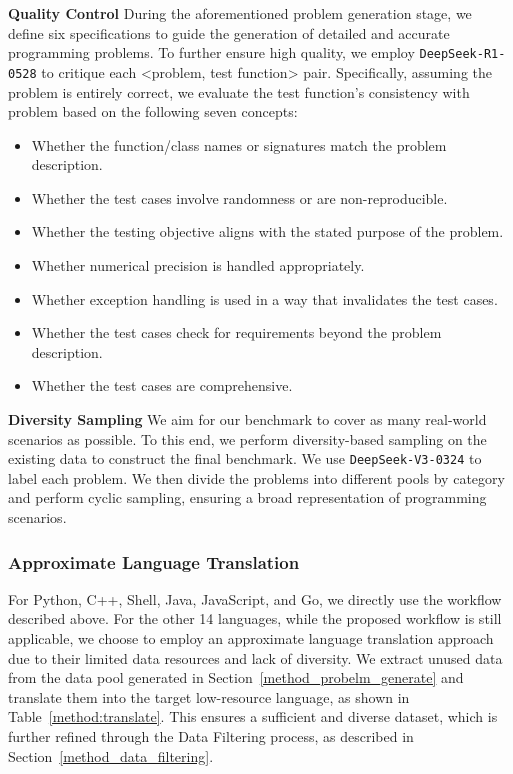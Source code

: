 \textbf{Quality Control} During the aforementioned problem generation stage, we define six specifications to guide the generation of detailed and accurate programming problems. To further ensure high quality, we employ \texttt{DeepSeek-R1-0528} to critique each \textless{}problem, test function\textgreater{} pair. Specifically, assuming the problem is entirely correct, we evaluate the test function’s consistency with problem based on the following seven concepts:
\begin{itemize}
    \item Whether the function/class names or signatures match the problem description.
    \item Whether the test cases involve randomness or are non-reproducible.
    \item Whether the testing objective aligns with the stated purpose of the problem.
    \item Whether numerical precision is handled appropriately.
    \item Whether exception handling is used in a way that invalidates the test cases.
    \item Whether the test cases check for requirements beyond the problem description.
    \item Whether the test cases are comprehensive.
\end{itemize}


\textbf{Diversity Sampling}
We aim for our benchmark to cover as many real-world scenarios as possible. To this end, we perform diversity-based sampling on the existing data to construct the final benchmark. We use \texttt{DeepSeek-V3-0324} to label each problem. We then divide the problems into different pools by category and perform cyclic sampling, ensuring a broad representation of programming scenarios.



\subsubsection{Approximate Language Translation}

For Python, C++, Shell, Java, JavaScript, and Go, we directly use the workflow described above. For the other 14 languages, while the proposed workflow is still applicable, we choose to employ an approximate language translation approach due to their limited data resources and lack of diversity. We extract unused data from the data pool generated in Section~\ref{method_probelm_generate} and translate them into the target low-resource language, as shown in Table~\ref{method:translate}. This ensures a sufficient and diverse dataset, which is further refined through the Data Filtering process, as described in Section~\ref{method_data_filtering}.






